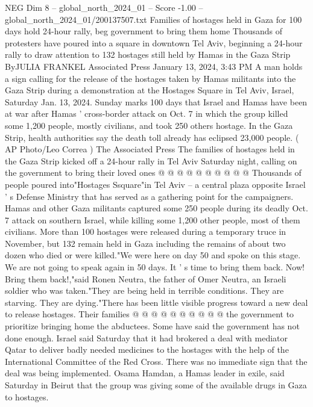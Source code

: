 \begin{textsample}{NEG Dim 8 – global\_north\_2024\_01 – Score -1.00 – global\_north\_2024\_01/200137507.txt}  \label{ex:f8_neg_216}
Families of hostages held in Gaza for 100 days hold 24-hour rally, beg government to bring them home Thousands of protesters have poured into a square in downtown Tel Aviv, beginning a 24-hour rally to draw attention to 132 hostages still held by Hamas in the Gaza Strip ByJULIA FRANKEL Associated Press January 13, 2024, 3:43 PM A man holds a sign calling for the release of the hostages taken by Hamas militants into the Gaza Strip during a demonstration at the Hostages Square in Tel Aviv, Israel, Saturday Jan. 13, 2024.
Sunday marks 100 days that Israel and Hamas have been at war after Hamas ' cross-border attack on Oct. 7 in which the group killed some 1,200 people, mostly civilians, and took 250 others hostage.
In the Gaza Strip, health authorities say the death toll already has eclipsed 23,000 people. ( AP Photo/Leo Correa ) The Associated Press The families of hostages held in the Gaza Strip kicked off a 24-hour rally in Tel Aviv Saturday night, calling on the government to bring their loved ones @ @ @ @ @ @ @ @ @ @ Thousands of people poured into"Hostages Ssquare"in Tel Aviv -- a central plaza opposite Israel ' s Defense Ministry that has served as a gathering point for the campaigners.
Hamas and other Gaza militants captured some 250 people during its deadly Oct. 7 attack on southern Israel, while killing some 1,200 other people, most of them civilians.
More than 100 hostages were released during a temporary truce in November, but 132 remain held in Gaza including the remains of about two dozen who died or were killed."We were here on day 50 and spoke on this stage.
We are not going to speak again in 50 days.
It ' s time to bring them back.
Now!
Bring them back!,"said Ronen Neutra, the father of Omer Neutra, an Israeli soldier who was taken."They are being held in terrible conditions.
They are starving.
They are dying."There has been little visible progress toward a new deal to release hostages.
Their families @ @ @ @ @ @ @ @ @ @ the government to prioritize bringing home the abductees.
Some have said the government has not done enough.
Israel said Saturday that it had brokered a deal with mediator Qatar to deliver badly needed medicines to the hostages with the help of the International Committee of the Red Cross.
There was no immediate sign that the deal was being implemented.
Osama Hamdan, a Hamas leader in exile, said Saturday in Beirut that the group was giving some of the available drugs in Gaza to hostages.

\end{textsample}
